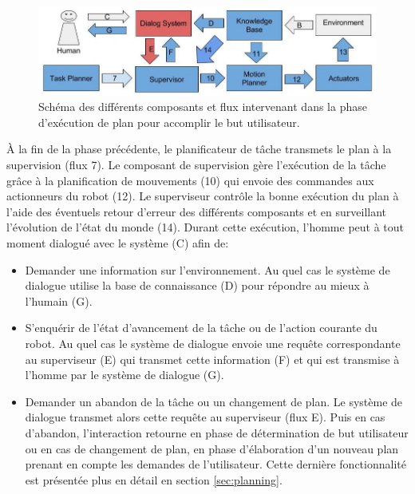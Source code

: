 \documentclass[a4paper,11pt,twoside]{StyleThese}
\begin{document}
\begin{figure}[ht!]
 \centering
  \includegraphics[width=0.99\linewidth]{./img/phase3color.jpg} 
  \caption {Schéma des différents composants et flux intervenant dans la phase d'exécution de plan pour accomplir le but utilisateur.}
  \label{fig:phase3}
\end{figure}

À la fin de la phase précédente, le planificateur de tâche transmets le plan à la supervision (flux 7). Le composant de supervision gère l'exécution de la tâche grâce à la planification de mouvements (10) qui envoie des commandes aux actionneurs du robot (12). Le superviseur contrôle la bonne exécution du plan à l'aide des éventuels retour d'erreur des différents composants et en surveillant l'évolution de l'état du monde (14). Durant cette exécution, l'homme peut à tout moment dialogué avec le système (C) afin de:
\begin{itemize}
\item Demander une information sur l'environnement. Au quel cas le système de dialogue utilise la base de connaissance (D) pour répondre au mieux à l'humain (G).
\item S'enquérir de l'état d'avancement de la tâche ou de l'action courante du robot. Au quel cas le système de dialogue envoie une requête correspondante au superviseur (E) qui transmet cette information (F) et qui est transmise à l'homme par le système de dialogue (G).
\item Demander un abandon de la tâche ou un changement de plan. Le système de dialogue transmet alors cette requête au superviseur (flux E). Puis en cas d'abandon, l'interaction retourne en phase de détermination de but utilisateur ou en cas de changement de plan, en phase d'élaboration d'un nouveau plan prenant en compte les demandes de l'utilisateur. Cette dernière fonctionnalité est présentée plus en détail en section \ref{sec:planning}.
\end{itemize}
\end{document}
